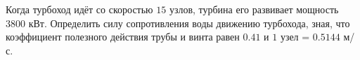 Когда турбоход идёт со скоростью $15$ узлов, турбина его развивает
мощность $3800$ кВт. Определить силу сопротивления воды движению
турбохода, зная, что коэффициент полезного действия трубы и винта равен
$0.41$ и $1$ узел = $0.5144$ м/с.

